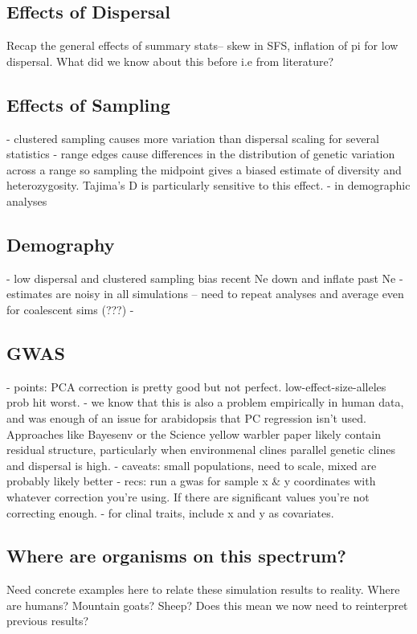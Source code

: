 \documentclass[10pt,twoside,lineno]{gsajnl}
\begin{document}
\subsection{Effects of Dispersal}
Recap the general effects of summary stats-- skew in SFS, inflation of pi for low dispersal. What did we know about this before i.e from literature? 

\subsection{Effects of Sampling}

- clustered sampling causes more variation than dispersal scaling for several statistics
- range edges cause differences in the distribution of genetic variation across a range so sampling the midpoint gives a biased estimate of diversity and heterozygosity. Tajima's D is particularly sensitive to this effect. 
- in demographic analyses 

\subsection{Demography}
- low dispersal and clustered sampling bias recent Ne down and inflate past Ne
- estimates are noisy in all simulations -- need to repeat analyses and average even for coalescent sims (???)
- 

\subsection{GWAS}

- points: PCA correction is pretty good but not perfect. low-effect-size-alleles prob hit worst. 
- we know that this is also a problem empirically in human data, and was enough of an issue for arabidopsis that PC regression isn't used. Approaches like Bayesenv or the Science yellow warbler paper likely contain residual structure, particularly when environmenal clines parallel genetic clines and dispersal is high. 
- caveats: small populations, need to scale, mixed are probably likely better
- recs: run a gwas for sample x & y coordinates with whatever correction you're using. If there are significant values you're not correcting enough.
- for clinal traits, include x and y as covariates. 

\subsection{Where are organisms on this spectrum?}
Need concrete examples here to relate these simulation results to reality. Where are humans? Mountain goats? Sheep? Does this mean we now need to reinterpret previous results? 
\end{document}
